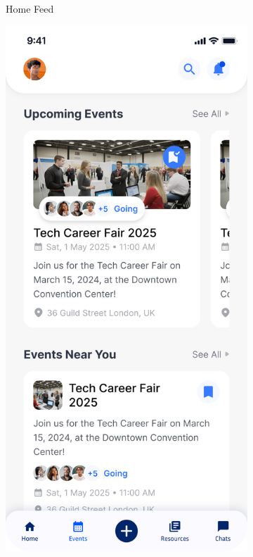 \begin{figure}[H]
\begin{subfigure}[b]{0.22\textwidth}
        \caption{Home Feed}
        \label{fig:mobile-home}
    \end{subfigure}
    \hfill
    \begin{subfigure}[b]{0.22\textwidth}
        \centering
        \includegraphics[width=\textwidth,height=0.3\textheight,keepaspectratio]{images/front_end_screens/mobile-events.png}

\end{subfigure}
\end{figure}
